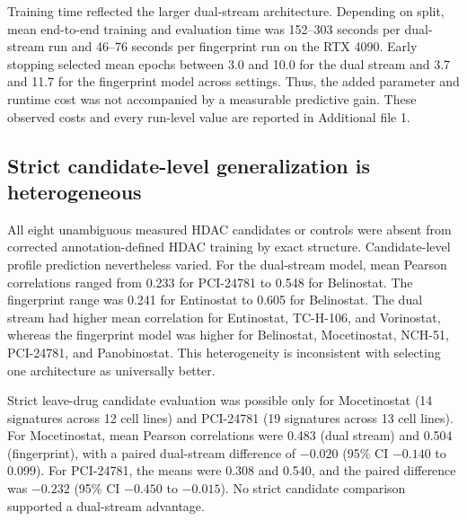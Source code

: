 \begin{roundtworevision}
Training time reflected the larger dual-stream architecture. Depending on split, mean end-to-end training and evaluation time was 152--303 seconds per dual-stream run and 46--76 seconds per fingerprint run on the RTX 4090. Early stopping selected mean epochs between 3.0 and 10.0 for the dual stream and 3.7 and 11.7 for the fingerprint model across settings. Thus, the added parameter and runtime cost was not accompanied by a measurable predictive gain. These observed costs and every run-level value are reported in Additional file 1.\par
\end{roundtworevision}

\subsection{Strict candidate-level generalization is heterogeneous}

All eight unambiguous measured HDAC candidates or controls were absent from corrected annotation-defined HDAC training by exact structure. Candidate-level profile prediction nevertheless varied. For the dual-stream model, mean Pearson correlations ranged from 0.233 for PCI-24781 to 0.548 for Belinostat. The fingerprint range was 0.241 for Entinostat to 0.605 for Belinostat. The dual stream had higher mean correlation for Entinostat, TC-H-106, and Vorinostat, whereas the fingerprint model was higher for Belinostat, Mocetinostat, NCH-51, PCI-24781, and Panobinostat. This heterogeneity is inconsistent with selecting one architecture as universally better.

Strict leave-drug candidate evaluation was possible only for Mocetinostat (14 signatures across 12 cell lines) and PCI-24781 (19 signatures across 13 cell lines).  For Mocetinostat, mean Pearson correlations were 0.483 (dual stream) and 0.504 (fingerprint), with a paired dual-stream difference of $-0.020$ (95\% CI $-0.140$ to 0.099). For PCI-24781, the means were 0.308 and 0.540, and the paired difference was $-0.232$ (95\% CI $-0.450$ to $-0.015$). No strict candidate comparison supported a dual-stream advantage.

